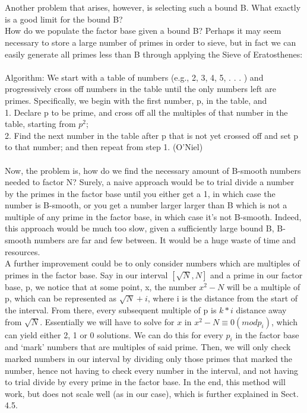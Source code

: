 \documentclass[12pt]{article} %
\begin{document}
\\\\Another problem that arises, however, is selecting such a bound B. What exactly is a good limit for the bound B? 
\\How do we populate the factor base given a bound B? Perhaps it may seem necessary to store a large number of primes in order to sieve, but in fact we can easily generate all primes less than B through applying the Sieve of Eratosthenes:
\\\\Algorithm: We start with a table of numbers (e.g., 2, 3, 4, 5, . . . ) and progressively cross off numbers in the table until the only numbers left are primes. Specifically, we begin with the first number, p, in the table, and 
\\1. Declare p to be prime, and cross off all the multiples of that number in the table, starting from $p^{2}$;
\\2. Find the next number in the table after p that is not yet crossed off and set p to that number; and then repeat from step 1. (O’Niel)
\\\\Now, the problem is, how do we find the necessary amount of B-smooth numbers needed to factor N? Surely, a naive approach would be to trial divide a number by the primes in the factor base until you either get a 1, in which case the number is B-smooth, or you get a number larger larger than B which is not a multiple of any prime in the factor base, in which case it’s not B-smooth. Indeed, this approach would be much too slow, given a sufficiently large bound B, B-smooth numbers are far and few between. It would be a huge waste of time and resources. 
\\A further improvement could be to only consider numbers which are multiples of primes in the factor base. Say in our interval $[\sqrt{N},N]$ and a prime in our factor base, p, we notice that at some point, x, the number $x^{2}-N$ will be a multiple of p, which can be represented as $\sqrt{N}+i$, where i is the distance from the start of the interval. From there, every subsequent multiple of p is $k*i$ distance away from $\sqrt{N}$. Essentially we will have to solve for $x$ in $x^{2}-N\equiv 0(mod p_i)$, which can yield either 2, 1 or 0 solutions. We can do this for every $p_i$ in the factor base and ‘mark’ numbers that are multiples of said prime. Then, we will only check marked numbers in our interval by dividing only those primes that marked the number, hence not having to check every number in the interval, and not having to trial divide by every prime in the factor base. In the end, this method will work, but does not scale well (as in our case), which is further explained in Sect. 4.5.
\end{document}
